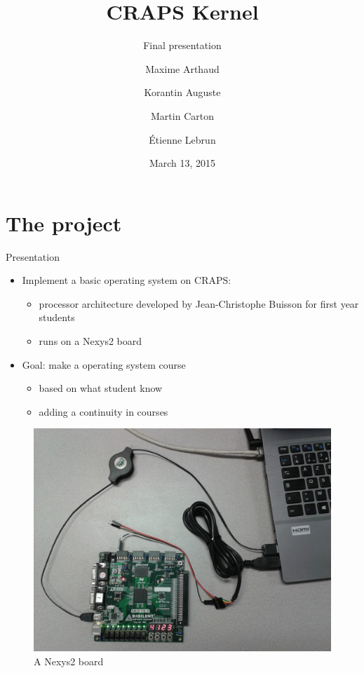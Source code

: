 \documentclass{beamer}
\title{CRAPS Kernel}
\subtitle{Final presentation}
\author{
       Maxime Arthaud
  \and Korantin Auguste
  \and Martin Carton
  \and Étienne Lebrun
}
\date{March 13, 2015}
\begin{document}
  \begin{frame}[plain]
    \titlepage%
  \end{frame}

  \begin{frame}[plain]
    \tableofcontents
  \end{frame}

  \section{The project}
    \begin{frame}{Presentation}
      \begin{itemize}
        \item Implement a basic operating system on CRAPS:
          \begin{itemize}
            \item processor architecture developed by Jean-Christophe
              Buisson for first year students
            \item runs on a Nexys2 board
          \end{itemize}
        \item Goal: make a operating system course
          \begin{itemize}
            \item based on what student know
            \item adding a continuity in courses
          \end{itemize}
      \end{itemize}
    \end{frame}

    \begin{frame}[plain]
      \begin{figure}
        \centering
        \includegraphics[width=\textwidth, keepaspectratio]{fig/Nexys2.jpg}
        \caption{A Nexys2 board}
      \end{figure}
    \end{frame}
\end{document}
